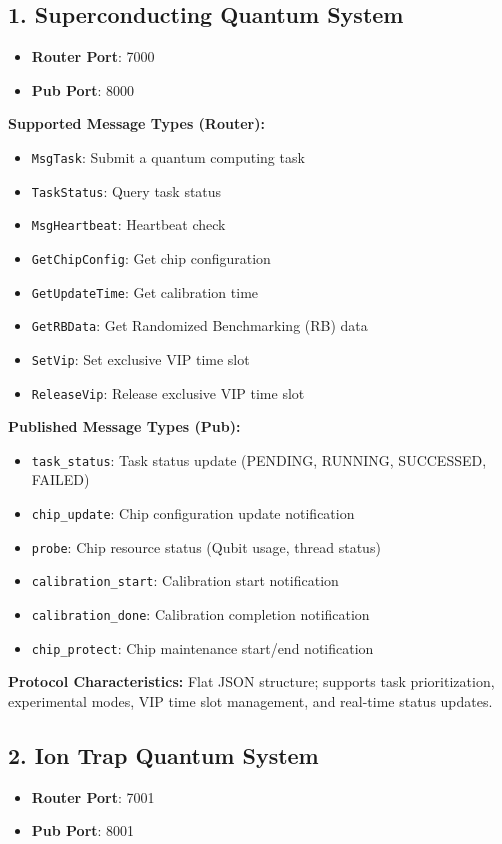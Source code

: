 \documentclass[UTF8, a4paper, 12pt]{article}
\begin{document}
\subsection{1. Superconducting Quantum System}
\begin{itemize}
    \item \textbf{Router Port}: 7000
    \item \textbf{Pub Port}: 8000
\end{itemize}

\textbf{Supported Message Types (Router):}
\begin{itemize}
    \item \texttt{MsgTask}: Submit a quantum computing task
    \item \texttt{TaskStatus}: Query task status
    \item \texttt{MsgHeartbeat}: Heartbeat check
    \item \texttt{GetChipConfig}: Get chip configuration
    \item \texttt{GetUpdateTime}: Get calibration time
    \item \texttt{GetRBData}: Get Randomized Benchmarking (RB) data
    \item \texttt{SetVip}: Set exclusive VIP time slot
    \item \texttt{ReleaseVip}: Release exclusive VIP time slot
\end{itemize}

\textbf{Published Message Types (Pub):}
\begin{itemize}
    \item \texttt{task\_status}: Task status update (PENDING, RUNNING, SUCCESSED, FAILED)
    \item \texttt{chip\_update}: Chip configuration update notification
    \item \texttt{probe}: Chip resource status (Qubit usage, thread status)
    \item \texttt{calibration\_start}: Calibration start notification
    \item \texttt{calibration\_done}: Calibration completion notification
    \item \texttt{chip\_protect}: Chip maintenance start/end notification
\end{itemize}

\textbf{Protocol Characteristics:} Flat JSON structure; supports task prioritization, experimental modes, VIP time slot management, and real-time status updates.

\subsection{2. Ion Trap Quantum System}
\begin{itemize}
    \item \textbf{Router Port}: 7001
    \item \textbf{Pub Port}: 8001
\end{itemize}
\end{document}
